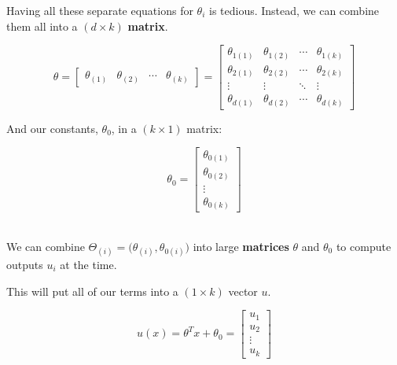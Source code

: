         Having all these separate equations for $\theta_i$ is tedious. Instead, we can combine them all into a $(d \times k)$ \textbf{matrix}.
        
        \begin{equation}
            \theta = 
            \begin{bmatrix}
                \theta_{(1)} & \theta_{(2)} & \cdots & \theta_{(k)}
            \end{bmatrix}
            =
            \begin{bmatrix}
                \theta_{1(1)} & \theta_{1(2)} & \cdots      & \theta_{1(k)}\\ 
                \theta_{2(1)} & \theta_{2(2)} & \cdots      & \theta_{2(k)}\\ 
                \vdots      & \vdots      & \ddots      & \vdots     \\ 
                \theta_{d(1)} & \theta_{d(2)} & \cdots      & \theta_{d(k)}
            \end{bmatrix}
        \end{equation}
        
        And our constants, $\theta_0$, in a $(k \times 1)$ matrix:
        
        \begin{equation}
            \theta_0 =
            \begin{bmatrix}
                \theta_{0(1)} \\ \theta_{0(2)} \\ \vdots \\ \theta_{0(k)}
            \end{bmatrix}
        \end{equation}\\
        
        \begin{concept}
            We can combine  $\Theta_{(i)}=\Big(\theta_{(i)}, \theta_{0(i)} \Big)$ into large \textbf{matrices} $\theta$ and $\theta_0$ to compute  outputs $u_i$ at the  time.
        \end{concept}
        
        This will put all of our terms into a $(1 \times k)$ vector $u$.
        
        \begin{equation}
            u(x) = 
            \theta^T x + \theta_0
            =
            \begin{bmatrix}
                u_1 \\ u_2 \\ \vdots \\ u_k
            \end{bmatrix}
        \end{equation}
    
